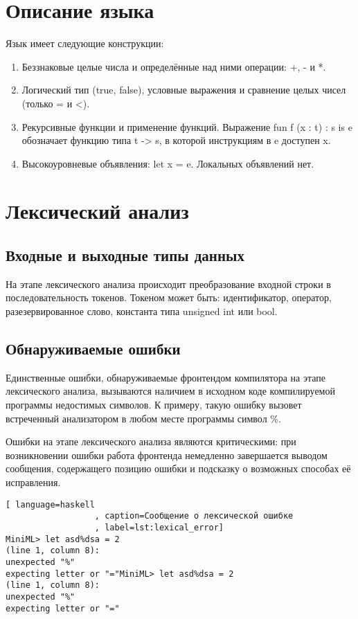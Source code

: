 \documentclass[a4paper,12pt]{article}
\numberwithin{equation}{section}
\begin{document}
\section{Описание языка}
Язык имеет следующие конструкции:
\begin{enumerate}
\item Беззнаковые целые числа и определённые над ними операции: +, - и *.
\item Логический тип (true, false), условные выражения и сравнение
  целых чисел (только = и <).
\item Рекурсивные функции и применение функций. Выражение 
  fun f (x : t) : s is e обозначает функцию типа t -> s, в которой
  инструкциям в e доступен x.
\item Высокоуровневые объявления: let x = e. Локальных объявлений нет.
\end{enumerate}

\section{Лексический анализ}
\subsection{Входные и выходные типы данных}
На этапе лексического анализа происходит преобразование входной строки
в последовательность токенов. Токеном может быть: идентификатор, оператор,
разезервированное слово, константа типа unsigned int или bool.

\subsection{Обнаруживаемые ошибки}
Единственные ошибки, обнаруживаемые фронтендом компилятора на этапе
лексического анализа, вызываются наличием в исходном коде компилируемой
программы недостимых символов. К примеру, такую ошибку вызовет встреченный
анализатором в любом месте программы символ \%.


Ошибки на этапе лексического анализа являются критическими: при возникновении
ошибки работа фронтенда немедленно завершается выводом сообщения, содержащего
позицию ошибки и подсказку о возможных способах её исправления.

\begin{lstlisting}[ language=haskell
                  , caption=Сообщение о лексической ошибке
                  , label=lst:lexical_error]
MiniML> let asd%dsa = 2
(line 1, column 8):
unexpected "%"
expecting letter or "="MiniML> let asd%dsa = 2
(line 1, column 8):
unexpected "%"
expecting letter or "="
\end{lstlisting}
\end{document}

